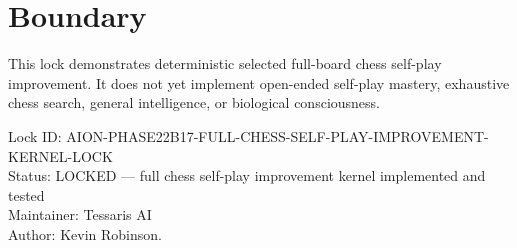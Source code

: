 \documentclass[11pt,a4paper]{article}
\begin{document}
\section{Boundary}

This lock demonstrates deterministic selected full-board chess self-play improvement. It does not yet implement open-ended self-play mastery, exhaustive chess search, general intelligence, or biological consciousness.

\bigskip

\noindent
Lock ID: AION-PHASE22B17-FULL-CHESS-SELF-PLAY-IMPROVEMENT-KERNEL-LOCK\\
Status: LOCKED --- full chess self-play improvement kernel implemented and tested\\
Maintainer: Tessaris AI\\
Author: Kevin Robinson.
\end{document}
